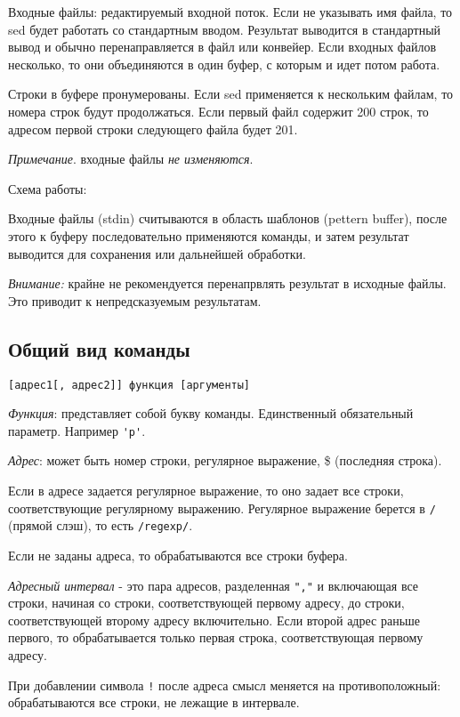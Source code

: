Входные файлы: редактируемый входной поток. Если не указывать имя файла, то sed будет работать со стандартным вводом. Результат выводится в стандартный вывод и обычно перенаправляется в файл или конвейер. Если входных файлов несколько, то они объединяются в один буфер, с которым и идет потом работа. 

Строки в буфере пронумерованы. Если sed применяется к нескольким файлам, то номера строк будут продолжаться. Если первый файл содержит 200 строк, то адресом первой строки следующего файла будет 201. 

\emph{Примечание}. входные файлы \emph{не изменяются}.

\begin{center}
Схема работы:
\end{center}
Входные файлы (stdin) считываются в область шаблонов (pettern buffer), после этого к буферу последовательно применяются команды, и затем результат выводится для сохранения или дальнейшей обработки.

\emph{Внимание:} крайне не рекомендуется перенапрвлять результат в исходные файлы. Это приводит к непредсказуемым результатам.

\subsection{Общий вид команды}

\verb+[адрес1[, адрес2]] функция [аргументы]+

\emph{Функция}: представляет собой букву команды. Единственный обязательный параметр. Например \verb+'p'+.

\emph{Адрес}: может быть номер строки, регулярное выражение, \$ (последняя строка).

Если в адресе задается регулярное выражение, то оно задает все строки, соответствующие регулярному выражению. Регулярное выражение берется в \verb+/+ (прямой слэш), то есть \verb+/regexp/+.

Если не заданы адреса, то обрабатываются все строки буфера.

\emph{Адресный интервал} - это пара адресов, разделенная \verb+","+ и включающая все строки, начиная со строки, соответствующей первому адресу, до строки, соответствующей второму адресу включительно. Если второй адрес  раньше первого, то обрабатывается только первая строка, соответствующая первому адресу.

При добавлении символа \verb+!+ после адреса смысл меняется на противоположный: обрабатываются все строки, не лежащие в интервале.

